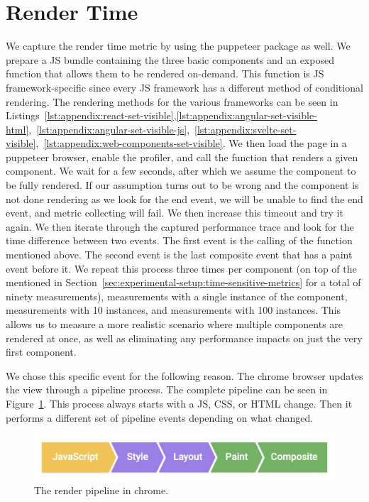 \section{Render Time}
We capture the render time metric by using the puppeteer package as well. We prepare a JS bundle containing the three basic components and an exposed function that allows them to be rendered on-demand. This function is JS framework-specific since every JS framework has a different method of conditional rendering. The rendering methods for the various frameworks can be seen in Listings~\ref{lst:appendix:react-set-visible},\ref{lst:appendix:angular-set-visible-html},~\ref{lst:appendix:angular-set-visible-js},~\ref{lst:appendix:svelte-set-visible},~\ref{lst:appendix:web-components-set-visible}. We then load the page in a puppeteer browser, enable the profiler, and call the function that renders a given component. We wait for a few seconds, after which we assume the component to be fully rendered. If our assumption turns out to be wrong and the component is not done rendering as we look for the end event, we will be unable to find the end event, and metric collecting will fail. We then increase this timeout and try it again. We then iterate through the captured performance trace and look for the time difference between two events. The first event is the calling of the function mentioned above. The second event is the last composite event that has a paint event before it. We repeat this process three times per component (on top of the \numMeasures{} mentioned in Section~\ref{sec:experimental-setup:time-sensitive-metrics} for a total of ninety measurements), \numMeasures{} measurements with a single instance of the component, \numMeasures{} measurements with 10 instances, and \numMeasures{} measurements with 100 instances. This allows us to measure a more realistic scenario where multiple components are rendered at once, as well as eliminating any performance impacts on just the very first component.

We chose this specific event for the following reason. The chrome browser updates the view through a pipeline process. The complete pipeline can be seen in Figure~\ref{fig:experimental-setup:pipeline}. This process always starts with a JS, CSS, or HTML change. Then it performs a different set of pipeline events depending on what changed.

\begin{figure}[h]
  \includegraphics[width=\columnwidth]{figures/experimental-setup/render-pipeline.jpg}
  \caption{The render pipeline in chrome.}
  \label{fig:experimental-setup:pipeline}
  \centering
\end{figure}


